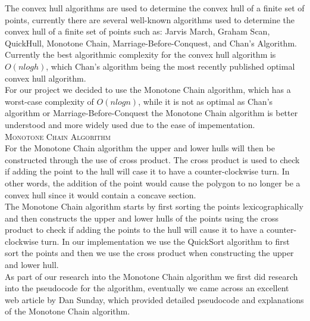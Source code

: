 \documentclass[pdftex,12pt,a4paper]{article}
\newcommand{\nspace}{\\[0.25cm]}
\newcommand{\Lspace}{\\[1.0cm]}
\begin{document}
The convex hull algorithms are used to determine the convex hull of a finite set of points,
currently there are several well-known algorithms used to determine the convex hull of a finite
set of points such as: Jarvis March, Graham Scan, QuickHull, Monotone Chain, Marriage-Before-Conquest, and Chan's Algorithm.  Currently the best algorithmic complexity for the convex hull algorithm is $O(n log h)$, which Chan's algorithm being the most recently published optimal  convex hull algorithm.\cite{chan1996optimal}\nspace


For our project we decided to use the Monotone Chain algorithm, which has a worst-case complexity
of $O(n log n)$, while it is not as optimal as Chan's algorithm or Marriage-Before-Conquest the Monotone Chain algorithm is better understood and more widely used due to the ease of impementation.\Lspace




\textsc{\Large Monotone Chain Algorithm} \hfill \nspace

For the Monotone Chain algorithm the upper and lower hulls will then be constructed through the use of cross product. The cross product is used to check if adding the point to the hull will case it to have a counter-clockwise turn. In other words, the addition of the point would cause the polygon to no longer be a convex hull since it would contain a concave section.\nspace

The Monotone Chain algorithm starts by first sorting the points lexicographically and then constructs the upper and lower hulls of the points using the cross product to check if adding the points to the hull will cause it to have a counter-clockwise turn. In our implementation we use the QuickSort algorithm to first sort the points and then we use the cross product when constructing the upper and lower hull.\nspace

As part of our research into the Monotone Chain algorithm we first did research into the
pseudocode for the algorithm, eventually we came across an excellent web article by Dan Sunday,
which provided detailed pseudocode and explanations of the Monotone Chain algorithm.\cite{website:monotonechainweb}
\end{document}

